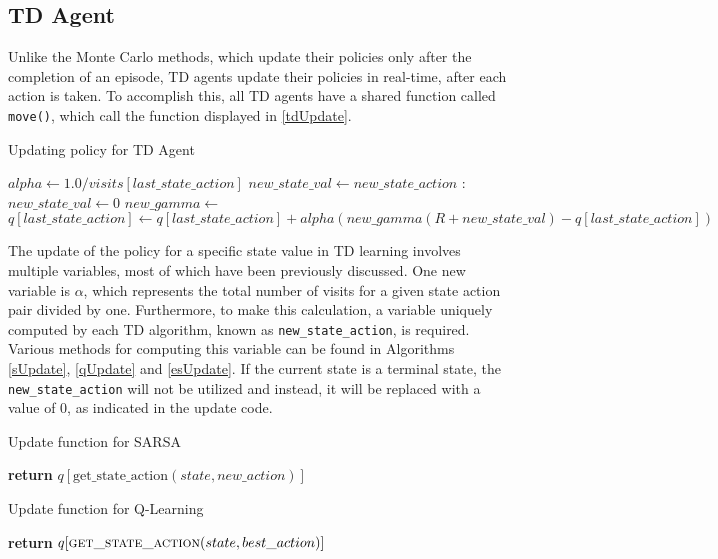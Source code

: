 \subsection{TD Agent}	
Unlike the Monte Carlo methods, which update their policies only after the completion of an episode, TD agents update their policies in real-time, after each action is taken. To accomplish this, all TD agents have a shared function called \texttt{move()}, which call the function displayed in \ref{tdUpdate}. 

\begin{algorithm}
\caption{Updating policy for TD Agent}\label{tdUpdate}
\begin{algorithmic}[1]
\State $ alpha \gets 1.0 / visits[last\_state\_action]$
\State $new\_state\_val \gets new\_state\_action$
:
\State $new\_state\_val \gets0$
\EndIf
\State $new\_gamma \gets $
\State $q[last\_state\_action] \gets q[last\_state\_action] + alpha(new\_gamma(R + new\_state\_val) - q[last\_state\_action])$
\end{algorithmic}
\end{algorithm}


The update of the policy for a specific state value in TD learning involves multiple variables, most of which have been previously discussed. One new variable is $\alpha$, which represents the total number of visits for a given state action pair divided by one. Furthermore, to make this calculation, a variable uniquely computed by each TD algorithm, known as \texttt{new\_state\_action}, is required. Various methods for computing this variable can be found in Algorithms \ref{sUpdate}, \ref{qUpdate} and \ref{esUpdate}. If the current state is a terminal state, the \texttt{new\_state\_action} will not be utilized and instead, it will be replaced with a value of 0, as indicated in the update code.

\begin{algorithm}
\caption{Update function for SARSA}\label{sUpdate}
\begin{algorithmic}[1]
\State \textbf{return} $q[\text{get\_state\_action}(state, new\_action)]$
\EndFunction
\end{algorithmic}
\end{algorithm}

\begin{algorithm}
\caption{Update function for Q-Learning}\label{qUpdate}
\begin{algorithmic}[1]
\State \textbf{return} $q[\Call{get\_state\_action}{state, best\_action}]$
\EndFunction
\end{algorithmic}
\end{algorithm}

